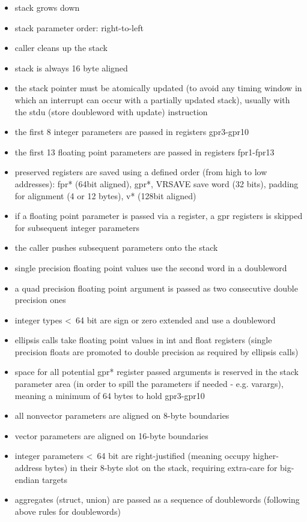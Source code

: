 \begin{itemize}
\item stack grows down
\item stack parameter order: right-to-left
\item caller cleans up the stack
\item stack is always 16 byte aligned
\item the stack pointer must be atomically updated (to avoid any timing window in which an interrupt can occur with a partially updated stack), usually with the stdu (store doubleword with update) instruction
\item the first 8 integer parameters are passed in registers gpr3-gpr10
\item the first 13 floating point parameters are passed in registers fpr1-fpr13
\item preserved registers are saved using a defined order (from high to low addresses):
 fpr* (64bit aligned),
 gpr*,
 VRSAVE save word (32 bits),
 padding for alignment (4 or 12 bytes),
 v* (128bit aligned)
\item if a floating point parameter is passed via a register, a gpr registers is skipped for subsequent integer parameters
\item the caller pushes subsequent parameters onto the stack
\item single precision floating point values use the second word in a doubleword 
\item a quad precision floating point argument is passed as two consecutive double precision ones
\item integer types \textless\ 64 bit are sign or zero extended and use a doubleword
\item ellipsis calls take floating point values in int and float registers (single precision floats are promoted to double precision as
required by ellipsis calls)
\item space for all potential gpr* register passed arguments is reserved in the stack parameter area (in order to spill the parameters if
needed - e.g. varargs), meaning a minimum of 64 bytes to hold gpr3-gpr10
\item all nonvector parameters are aligned on 8-byte boundaries
\item vector parameters are aligned on 16-byte boundaries
\item integer parameters \textless\ 64 bit are right-justified (meaning occupy higher-address bytes) in their 8-byte slot on the stack, requiring extra-care for big-endian targets
\item aggregates (struct, union) are passed as a sequence of doublewords (following above rules for doublewords)
\end{itemize}


